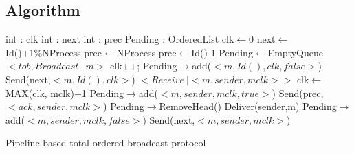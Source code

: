 \documentclass[a4paper]{article}
\begin{document}
\subsection{Algorithm}
\begin{algorithm}[H]
    \centering
    \begin{algorithmic}[5]
        \Data
        \State int : clk
        \State int : next
        \State int : prec
        \State Pending : OrderedList
        \EndData
        \Init
        \State clk$\gets$0
        \State next$\gets$Id()+1\%NProcess
        \State prec$\gets$NProcess
        \Else
        \State prec$\gets$Id()-1
        \EndIf
        \State Pending$\gets$EmptyQueue
        \EndInit
        \Event $< tob,Broadcast\ |\ m> $
        \State clk++;
        \State Pending$\rightarrow$add($<m,Id(), clk, false>$) 
        \State Send(next,$<m,Id(),clk>$)
        \EndEvent
        \Event $<Receive\ | <m,sender, mclk>>$
        \State clk$\gets$MAX(clk, mclk)+1
        \State Pending$\rightarrow$add($<m,sender,mclk,true>$)
        \State Send(prec,$<ack,sender,mclk>$)
        \State Pending$\rightarrow$RemoveHead()
        \State Deliver(sender,m)
        \EndIf
        \Else
        \State Pending$\rightarrow$add($<m,sender,mclk,false>$)
        \State Send(next,$<m,sender,mclk>$)
        \EndIf
        \EndEvent
    \end{algorithmic}
    \caption{Pipeline based total ordered broadcast protocol}
\end{algorithm}
\end{document}
